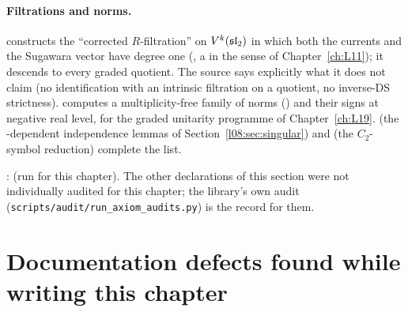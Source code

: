 \paragraph{Filtrations and norms.}
 constructs the ``corrected $R$-filtration'' on $V^k(\mathfrak{sl}_2)$ in which
both the currents and the Sugawara vector have degree one (, a
 in the sense of Chapter~\ref{ch:L11}); it descends to every graded quotient. The
source says explicitly what it does not claim (no identification with an intrinsic filtration on a
quotient, no inverse-DS strictness).  computes a multiplicity-free family of
norms (\allowbreak{}\allowbreak{}) and their signs at negative real level, for the graded
unitarity programme of Chapter~\ref{ch:L19}.  (the -dependent independence
lemmas of Section~\ref{l08:sec:singular}) and  (the $C_2$-symbol
reduction) complete the list.

\begin{status}
\allowbreak{}\allowbreak{}\allowbreak{}: \lean{[propext, Classical.}\allowbreak{}\allowbreak\lean{sound]} (run for this chapter). The other declarations of this section were not individually
audited for this chapter; the library's own audit (\texttt{scripts/audit/run\_axiom\_audits.py}) is
the record for them.
\end{status}

\section{Documentation defects found while writing this chapter}\label{l08:sec:docs}


